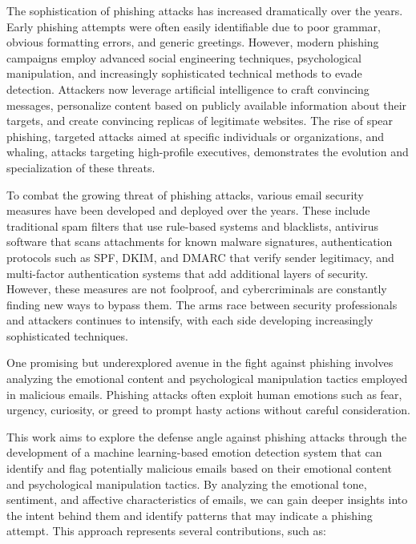 The sophistication of phishing attacks has increased dramatically over the years. Early phishing attempts were often easily identifiable due to poor grammar, obvious formatting errors, and generic greetings. However, modern phishing campaigns employ advanced social engineering techniques, psychological manipulation, and increasingly sophisticated technical methods to evade detection. Attackers now leverage artificial intelligence to craft convincing messages, personalize content based on publicly available information about their targets, and create convincing replicas of legitimate websites. The rise of spear phishing, targeted attacks aimed at specific individuals or organizations, and whaling, attacks targeting high-profile executives, demonstrates the evolution and specialization of these threats.

To combat the growing threat of phishing attacks, various email security measures have been developed and deployed over the years. These include traditional spam filters that use rule-based systems and blacklists, antivirus software that scans attachments for known malware signatures, authentication protocols such as \ac{SPF}, \ac{DKIM}, and \ac{DMARC} that verify sender legitimacy, and multi-factor authentication systems that add additional layers of security. However, these measures are not foolproof, and cybercriminals are constantly finding new ways to bypass them. The arms race between security professionals and attackers continues to intensify, with each side developing increasingly sophisticated techniques.

One promising but underexplored avenue in the fight against phishing involves analyzing the emotional content and psychological manipulation tactics employed in malicious emails. Phishing attacks often exploit human emotions such as fear, urgency, curiosity, or greed to prompt hasty actions without careful consideration. 

This work aims to explore the defense angle against phishing attacks through the development of a machine learning-based emotion detection system that can identify and flag potentially malicious emails based on their emotional content and psychological manipulation tactics. By analyzing the emotional tone, sentiment, and affective characteristics of emails, we can gain deeper insights into the intent behind them and identify patterns that may indicate a phishing attempt. This approach represents several contributions, such as:

